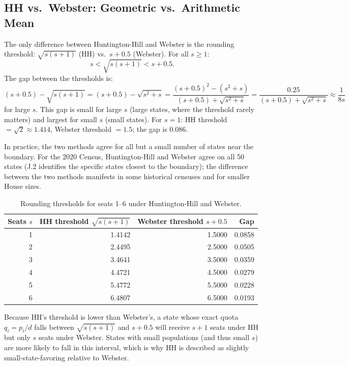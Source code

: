 \label{sec:comparison}

\subsection{HH vs.\ Webster: Geometric vs.\ Arithmetic Mean}

The only difference between Huntington-Hill and Webster is the rounding
threshold: $\sqrt{s(s+1)}$ (HH) vs.\ $s + 0.5$ (Webster).
For all $s \geq 1$:
\[
  s < \sqrt{s(s+1)} < s + 0.5.
\]
The gap between the thresholds is:
\[
  (s+0.5) - \sqrt{s(s+1)}
  = (s+0.5) - \sqrt{s^2+s}
  = \frac{(s+0.5)^2 - (s^2+s)}{(s+0.5) + \sqrt{s^2+s}}
  = \frac{0.25}{(s+0.5) + \sqrt{s^2+s}}
  \approx \frac{1}{8s}
\]
for large $s$.
This gap is small for large $s$ (large states, where the threshold
rarely matters) and largest for small $s$ (small states).
For $s = 1$: HH threshold $= \sqrt{2} \approx 1.414$, Webster threshold
$= 1.5$; the gap is 0.086.

In practice, the two methods agree for all but a small number of states
near the boundary.
For the 2020 Census, Huntington-Hill and Webster agree on all 50 states
(J.2 identifies the specific states closest to the boundary);
the difference between the two methods manifests in some historical
censuses and for smaller House sizes.

\begin{table}[h]
\centering
\caption{Rounding thresholds for seats 1--6 under Huntington-Hill and Webster.}
\label{tab:thresholds}
\begin{tabular}{rrrr}
\toprule
Seats $s$ & HH threshold $\sqrt{s(s+1)}$ & Webster threshold $s+0.5$ & Gap \\
\midrule
1 & 1.4142 & 1.5000 & 0.0858 \\
2 & 2.4495 & 2.5000 & 0.0505 \\
3 & 3.4641 & 3.5000 & 0.0359 \\
4 & 4.4721 & 4.5000 & 0.0279 \\
5 & 5.4772 & 5.5000 & 0.0228 \\
6 & 6.4807 & 6.5000 & 0.0193 \\
\bottomrule
\end{tabular}
\end{table}

Because HH's threshold is lower than Webster's, a state whose exact quota
$q_i = p_i/d$ falls between $\sqrt{s(s+1)}$ and $s+0.5$ will receive
$s+1$ seats under HH but only $s$ seats under Webster.
States with small populations (and thus small $s$) are more likely
to fall in this interval, which is why HH is described as
slightly small-state-favoring relative to Webster.

